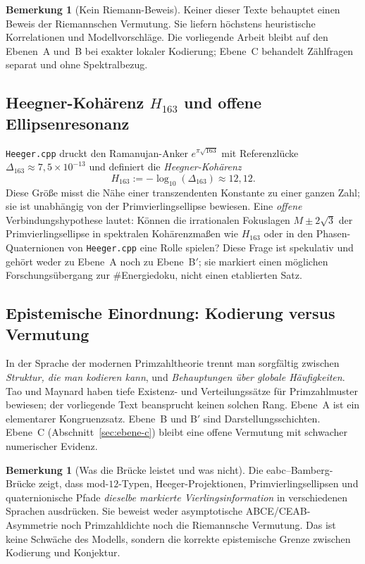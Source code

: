 \documentclass[11pt,a4paper]{article}
\theoremstyle{definition}
\newtheorem{bemerkung}[definition]{Bemerkung}
\theoremstyle{plain}
\begin{document}
	\begin{bemerkung}[Kein Riemann-Beweis]
		Keiner dieser Texte behauptet einen Beweis der Riemannschen Vermutung. Sie liefern höchstens heuristische Korrelationen und Modellvorschläge. Die vorliegende Arbeit bleibt auf den Ebenen~A und~B bei exakter lokaler Kodierung; Ebene~C behandelt Zählfragen separat und ohne Spektralbezug.
	\end{bemerkung}
	
	\subsection{Heegner-Kohärenz $H_{163}$ und offene Ellipsenresonanz}
	
	\texttt{Heeger.cpp} druckt den Ramanujan-Anker $e^{\pi\sqrt{163}}$ mit Referenzlücke $\Delta_{163}\approx7{,}5\times10^{-13}$ und definiert die \emph{Heegner-Kohärenz}
	\[
	H_{163}:=-\log_{10}(\Delta_{163})\approx 12{,}12.
	\]
	Diese Größe misst die Nähe einer transzendenten Konstante zu einer ganzen Zahl; sie ist unabhängig von der Primvierlingsellipse bewiesen. Eine \emph{offene} Verbindungshypothese lautet: Können die irrationalen Fokuslagen $M\pm2\sqrt{3}$ der Primvierlingsellipse in spektralen Kohärenzmaßen wie $H_{163}$ oder in den Phasen-Quaternionen von \texttt{Heeger.cpp} eine Rolle spielen? Diese Frage ist spekulativ und gehört weder zu Ebene~A noch zu Ebene~B$'$; sie markiert einen möglichen Forschungsübergang zur \#Energiedoku, nicht einen etablierten Satz.
	
	\subsection{Epistemische Einordnung: Kodierung versus Vermutung}
	
	In der Sprache der modernen Primzahltheorie trennt man sorgfältig zwischen \emph{Struktur, die man kodieren kann}, und \emph{Behauptungen über globale Häufigkeiten}. Tao und Maynard haben tiefe Existenz- und Verteilungssätze für Primzahlmuster bewiesen; der vorliegende Text beansprucht keinen solchen Rang. Ebene~A ist ein elementarer Kongruenzsatz. Ebene~B und B$'$ sind Darstellungsschichten. Ebene~C (Abschnitt~\ref{sec:ebene-c}) bleibt eine offene Vermutung mit schwacher numerischer Evidenz.
	
	\begin{bemerkung}[Was die Brücke leistet und was nicht]
		Die eabc--Bamberg-Brücke zeigt, dass mod-$12$-Typen, Heeger-Projektionen, Primvierlingsellipsen und quaternionische Pfade \emph{dieselbe markierte Vierlingsinformation} in verschiedenen Sprachen ausdrücken. Sie beweist weder asymptotische ABCE/CEAB-Asymmetrie noch Primzahldichte noch die Riemannsche Vermutung. Das ist keine Schwäche des Modells, sondern die korrekte epistemische Grenze zwischen Kodierung und Konjektur.
	\end{bemerkung}
	
\end{document}
